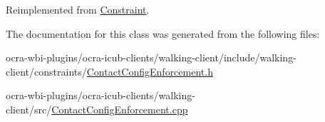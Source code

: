 \-Reimplemented from \hyperlink{classConstraint_a07453509c3f0f95034db965c9e699810}{\-Constraint}.



\-The documentation for this class was generated from the following files\-:\begin{DoxyCompactItemize}
\item 
ocra-\/wbi-\/plugins/ocra-\/icub-\/clients/walking-\/client/include/walking-\/client/constraints/\hyperlink{ContactConfigEnforcement_8h}{\-Contact\-Config\-Enforcement.\-h}\item 
ocra-\/wbi-\/plugins/ocra-\/icub-\/clients/walking-\/client/src/\hyperlink{ContactConfigEnforcement_8cpp}{\-Contact\-Config\-Enforcement.\-cpp}\end{DoxyCompactItemize}
